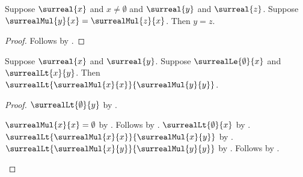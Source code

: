 \begin{corollary}\label{surreal_mul_nonzero_cancel_right}
    Suppose $\surreal{x}$ and $x\neq\emptyset$ and
        $\surreal{y}$ and $\surreal{z}$.
    Suppose $\surrealMul{y}{x}=\surrealMul{z}{x}$.
    Then $y=z$.
\end{corollary}
\begin{proof}
    Follows by
        .
\end{proof}

\begin{theorem}\label{surreal_square_strict_monotone_nonnegative}
    Suppose $\surreal{x}$ and $\surreal{y}$.
    Suppose $\surrealLe{\emptyset}{x}$ and $\surrealLt{x}{y}$.
    Then $\surrealLt{\surrealMul{x}{x}}{\surrealMul{y}{y}}$.
\end{theorem}
\begin{proof}
    $\surrealLt{\emptyset}{y}$
        by .
    \begin{byCase}
            $\surrealMul{x}{x}=\emptyset$
                by .
            Follows by .
            $\surrealLt{\emptyset}{x}$
                by .
            $\surrealLt{\surrealMul{x}{x}}{\surrealMul{x}{y}}$
                by .
            $\surrealLt{\surrealMul{x}{y}}{\surrealMul{y}{y}}$
                by .
            Follows by
                .
    \end{byCase}
\end{proof}

